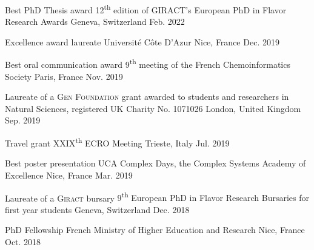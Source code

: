 
\begin{cvhonors}

	\cvhonor
	{Best PhD Thesis award}
	{12\textsuperscript{th} edition of GIRACT's European PhD in Flavor Research Awards}
	{Geneva, Switzerland}
	{Feb. 2022}

  \cvhonor
  	{Excellence award laureate}
  	{Université Côte D'Azur}
  	{Nice, France}
  	{Dec. 2019}

  \cvhonor
  	{Best oral communication award}
  	{9\textsuperscript{th} meeting of the French Chemoinformatics Society}
  	{Paris, France}
  	{Nov. 2019}

  \cvhonor
  	{Laureate of a \textsc{Gen Foundation} grant}
  	{awarded to students and researchers in Natural Sciences, registered UK Charity No. 1071026}
  	{London, United Kingdom}
  	{Sep. 2019}

  \cvhonor
  	{Travel grant}
  	{\textsc{XXIX}\textsuperscript{th} \textsc{ECRO} Meeting}
  	{Trieste, Italy}
  	{Jul. 2019}

  \cvhonor
  	{Best poster presentation}
  	{UCA Complex Days, the Complex Systems Academy of Excellence}
  	{Nice, France}
  	{Mar. 2019}

  \cvhonor
  	{Laureate of a \textsc{Giract} bursary}
  	{9\textsuperscript{th} European PhD in Flavor Research Bursaries for first year students}
  	{Geneva, Switzerland}
  	{Dec. 2018}

  \cvhonor
  	{PhD Fellowship}
  	{French Ministry of Higher Education and Research}
  	{Nice, France}
  	{Oct. 2018}

\end{cvhonors}

